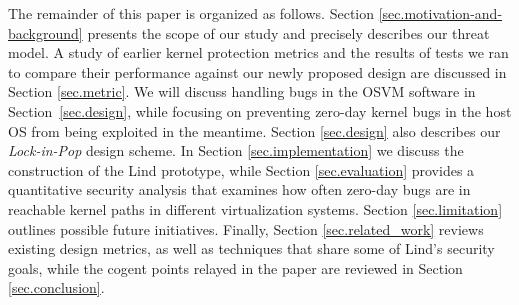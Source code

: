 The remainder of this paper is organized as follows.
Section \ref{sec.motivation-and-background} presents the scope of our study 
and precisely describes our threat model.
A study of earlier kernel protection metrics and the results of tests we ran to compare their performance
against our newly proposed design are discussed in Section \ref{sec.metric}.
We will discuss handling bugs in the OSVM software in 
Section~\ref{sec.design}, while focusing on preventing zero-day kernel
bugs in the host OS from being exploited in the meantime.
Section \ref{sec.design} also describes our \emph{Lock-in-Pop} 
design scheme.
In Section \ref{sec.implementation} we discuss the construction of the Lind 
prototype, while Section \ref{sec.evaluation} provides a quantitative security 
analysis that examines how often zero-day bugs are in reachable kernel paths
in different virtualization systems.
Section \ref{sec.limitation} outlines possible future initiatives.
Finally, Section \ref{sec.related_work} reviews existing design metrics, as well as 
techniques that share some of Lind's security goals,
while the cogent points relayed in the paper are reviewed in Section \ref{sec.conclusion}.
%
